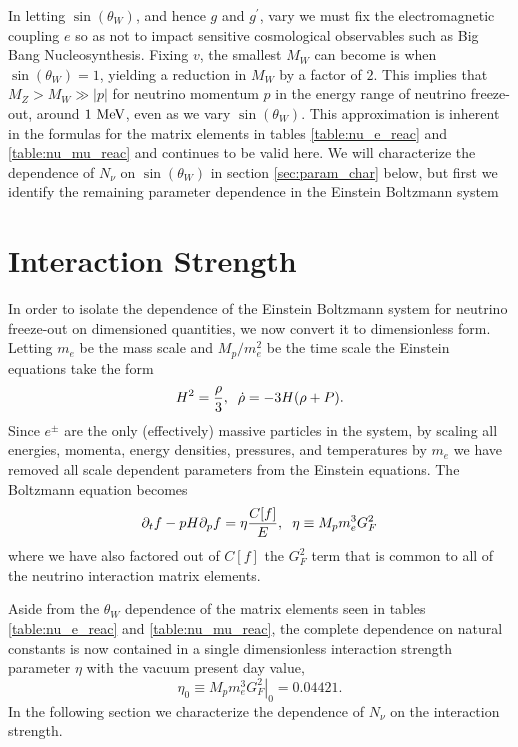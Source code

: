 In letting $\sin(\theta_W)$, and hence $g$ and $g^{'}$, vary we must fix the electromagnetic coupling $e$ so as not to impact sensitive cosmological observables such as Big Bang Nucleosynthesis.  Fixing $v$, the smallest $M_W$ can become is when $\sin(\theta_W)=1$, yielding a reduction in $M_W$ by a factor of $2$.  This implies that $M_Z>M_W\gg |p|$ for neutrino momentum $p$ in the energy range of neutrino freeze-out, around $1\text{ MeV}$, even as we vary $\sin(\theta_W)$.  This approximation is inherent in the formulas for the matrix elements  in tables  \ref{table:nu_e_reac} and \ref{table:nu_mu_reac} and continues to be valid here. We will characterize the dependence of $N_\nu$ on $\sin(\theta_W)$ in section \ref{sec:param_char} below, but first we identify the remaining parameter dependence in the Einstein Boltzmann system


\section{Interaction Strength}
 In order to isolate the dependence of the Einstein Boltzmann system for neutrino freeze-out on dimensioned quantities, we now convert it to dimensionless form. Letting $m_e$ be the mass scale and $M_p/m_e^2$ be the time scale the Einstein equations take the form
\begin{equation}
H^2=\frac{\rho}{3},\hspace{2mm}\dot\rho=-3H(\rho+P).
\end{equation}
 Since $e^\pm$ are the only (effectively) massive particles in the system, by scaling all energies, momenta, energy densities, pressures, and temperatures by $m_e$ we have removed all scale dependent parameters from the Einstein equations.  The Boltzmann equation becomes
\begin{equation}\label{eta_def}
\partial_tf-pH\partial_pf=\eta\frac{C[f]}{E},\hspace{2mm}\eta\equiv M_p m_e^3G_F^2
\end{equation}
where we have also factored out of $C[f]$ the $G_F^2$ term that is common to all of the neutrino interaction matrix elements. 

Aside from the $\theta_W$ dependence of the matrix elements seen in tables \ref{table:nu_e_reac} and \ref{table:nu_mu_reac}, the complete dependence on natural constants  is now contained in a single dimensionless interaction strength parameter $\eta$ with the vacuum present day value,
\begin{equation}\label{eta0_def}
\eta_0\equiv \left.M_p m_e^3 G_F^2\right|_0  = 0.04421 .
\end{equation}
In the following section we characterize the dependence of $N_\nu$ on the interaction strength.  




